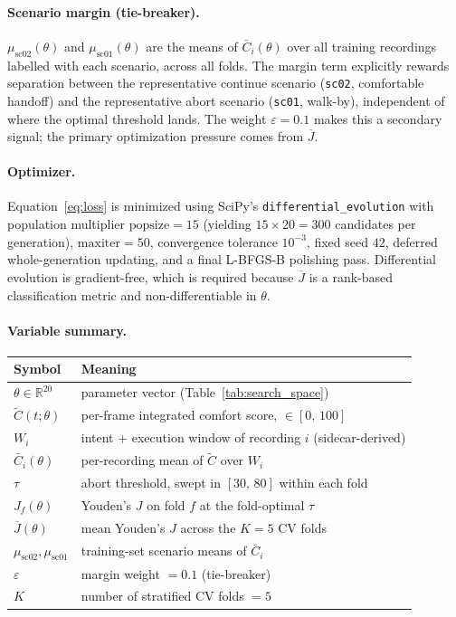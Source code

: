 \documentclass[11pt]{article}
\begin{document}
\paragraph{Scenario margin (tie-breaker).}
$\mu_{\mathrm{sc02}}(\theta)$ and $\mu_{\mathrm{sc01}}(\theta)$ are the
means of $\bar{C}_i(\theta)$ over all training recordings labelled with
each scenario, across all folds. The margin term explicitly rewards
separation between the representative continue scenario
(\texttt{sc02}, comfortable handoff) and the representative abort scenario
(\texttt{sc01}, walk-by), independent of where the optimal threshold lands.
The weight $\varepsilon = 0.1$ makes this a secondary signal; the primary
optimization pressure comes from $\overline{J}$.

\paragraph{Optimizer.}
Equation~\eqref{eq:loss} is minimized using SciPy's
\texttt{differential\_evolution} with population multiplier $\mathrm{popsize}{=}15$
(yielding $15 \times 20 = 300$ candidates per generation), $\mathrm{maxiter}{=}50$,
convergence tolerance $10^{-3}$, fixed seed $42$, deferred whole-generation
updating, and a final L-BFGS-B polishing pass. Differential evolution is
gradient-free, which is required because $\overline{J}$ is a rank-based
classification metric and non-differentiable in $\theta$.

\paragraph{Variable summary.}
\begin{table}[h]
\centering
\small
\setlength{\tabcolsep}{8pt}
\renewcommand{\arraystretch}{1.15}
\begin{tabular}{l l}
\toprule
Symbol & Meaning \\
\midrule
$\theta \in \mathbb{R}^{20}$ & parameter vector (Table~\ref{tab:search_space}) \\
$\tilde{C}(t; \theta)$ & per-frame integrated comfort score, $\in [0,\,100]$ \\
$W_i$ & intent + execution window of recording $i$ (sidecar-derived) \\
$\bar{C}_i(\theta)$ & per-recording mean of $\tilde{C}$ over $W_i$ \\
$\tau$ & abort threshold, swept in $[30,\,80]$ within each fold \\
$J_f(\theta)$ & Youden's $J$ on fold $f$ at the fold-optimal $\tau$ \\
$\overline{J}(\theta)$ & mean Youden's $J$ across the $K{=}5$ CV folds \\
$\mu_{\mathrm{sc02}}, \mu_{\mathrm{sc01}}$ & training-set scenario means of $\bar{C}_i$ \\
$\varepsilon$ & margin weight $= 0.1$ (tie-breaker) \\
$K$ & number of stratified CV folds $= 5$ \\
\bottomrule
\end{tabular}
\end{table}
\end{document}
